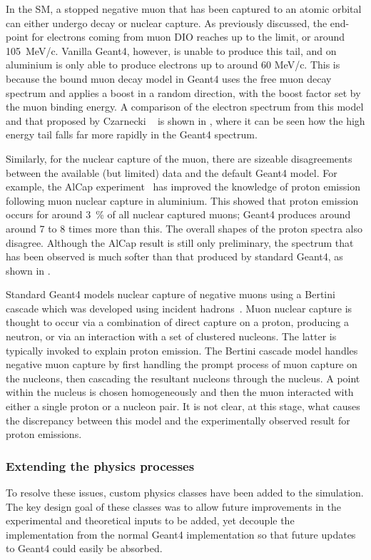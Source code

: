 In the \ac{SM}, a stopped negative muon that has been captured to an atomic orbital can either undergo decay or nuclear capture.
As previously discussed, the end-point for electrons coming from muon \ac{DIO} reaches up to the \mueconv limit, or around 105~MeV/c.  
Vanilla Geant4, however, is unable to produce this tail, and on aluminium is only able to produce electrons up to around 60 MeV/c.  
This is because the bound muon decay model in Geant4 uses the free muon decay spectrum and applies a boost in a random direction, with the boost factor set by the muon binding energy.
A comparison of the electron spectrum from this model and that proposed by Czarnecki \etal~\cite{Czarnecki2011} is shown in , where it can be seen how the high energy tail falls far more rapidly in the Geant4 spectrum.

Similarly, for the nuclear capture of the muon, there are sizeable disagreements between the available (but limited) data and the default Geant4 model.
For example, the AlCap experiment~\cite{AlcapProposal2012} has improved the knowledge of proton emission following muon nuclear capture in aluminium.
This showed that proton emission occurs for around 3~\% of all nuclear captured muons; Geant4 produces around around 7 to 8 times more than this.
The overall shapes of the proton spectra also disagree.
Although the AlCap result is still only preliminary, the spectrum that has been observed is much softer than that produced by standard Geant4, as shown in .

Standard Geant4 models nuclear capture of negative muons using a Bertini cascade which was developed using incident hadrons~\cite{Geant4:Bertini}.
Muon nuclear capture is thought to occur via a combination of direct capture on a proton, producing a neutron, or via an interaction with a set of clustered nucleons.
The latter is typically invoked to explain proton emission.
The Bertini cascade model handles negative muon capture by first handling the prompt process of muon capture on the nucleons, then cascading the resultant nucleons through the nucleus.
A point within the nucleus is chosen homogeneously and then the muon interacted with either a single proton or a nucleon pair.
It is not clear, at this stage, what causes the discrepancy between this model and the experimentally observed result for proton emissions.

\subsubsection{Extending the physics processes}
To resolve these issues, custom physics classes have been added to the \COMET simulation.
The key design goal of these classes was to allow future improvements in the experimental and theoretical inputs to be added, yet decouple the implementation from the normal Geant4 implementation so that future updates to Geant4 could easily be absorbed.

